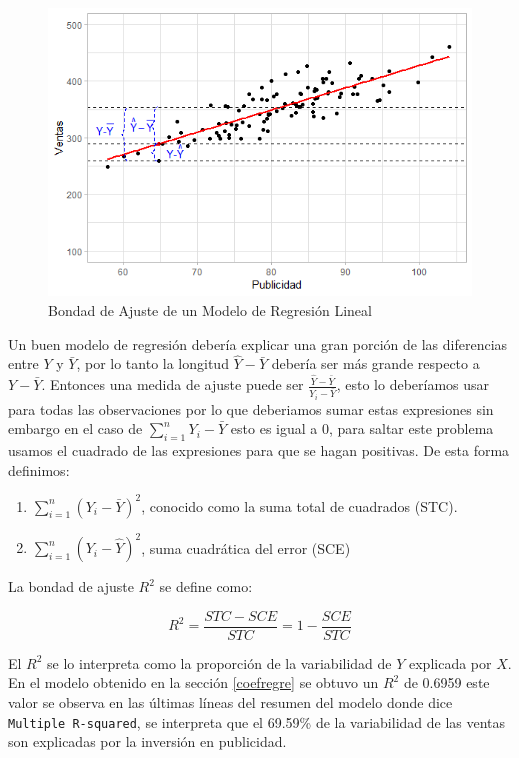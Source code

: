 \documentclass[]{book}
\providecommand{\tightlist}{%
  \setlength{\itemsep}{0pt}\setlength{\parskip}{0pt}}
\begin{document}
\begin{figure}[h]

{\centering \includegraphics[width=0.5\linewidth]{error5} 

}

\caption{Bondad de Ajuste de un Modelo de Regresión Lineal}\label{fig:determinacion}
\end{figure}

Un buen modelo de regresión debería explicar una gran porción de las diferencias entre \(Y\) y \(\bar{Y}\), por lo tanto la longitud \(\hat{Y}-\bar{Y}\) debería ser más grande respecto a \(Y-\bar{Y}\). Entonces una medida de ajuste puede ser \(\frac{\hat{Y}-\bar{Y}}{Y_i-\bar{Y}}\), esto lo deberíamos usar para todas las observaciones por lo que deberiamos sumar estas expresiones sin embargo en el caso de \(\sum_{i=1}^{n}{Y_i-\bar{Y}}\) esto es igual a \(0\), para saltar este problema usamos el cuadrado de las expresiones para que se hagan positivas. De esta forma definimos:

\begin{enumerate}
\def\labelenumi{\arabic{enumi}.}
\tightlist
\item
  \(\sum_{i=1}^{n}{\left(Y_i-\bar{Y}\right)^2}\), conocido como la suma total de cuadrados (STC).
\item
  \(\sum_{i=1}^{n}{\left(Y_i-\hat{Y}\right)^2}\), suma cuadrática del error (SCE)
\end{enumerate}

La bondad de ajuste \(R^2\) se define como:

\begin{equation}
R^2 = \dfrac{STC-SCE}{STC} = 1 - \dfrac{SCE}{STC}
    \label{eq:rscuared}
\end{equation}

El \(R^2\) se lo interpreta como la proporción de la variabilidad de \(Y\) explicada por \(X\). En el modelo obtenido en la sección \ref{coefregre} se obtuvo un \(R^2\) de 0.6959 este valor se observa en las últimas líneas del resumen del modelo donde dice \texttt{Multiple\ R-squared}, se interpreta que el 69.59\% de la variabilidad de las ventas son explicadas por la inversión en publicidad.
\end{document}
